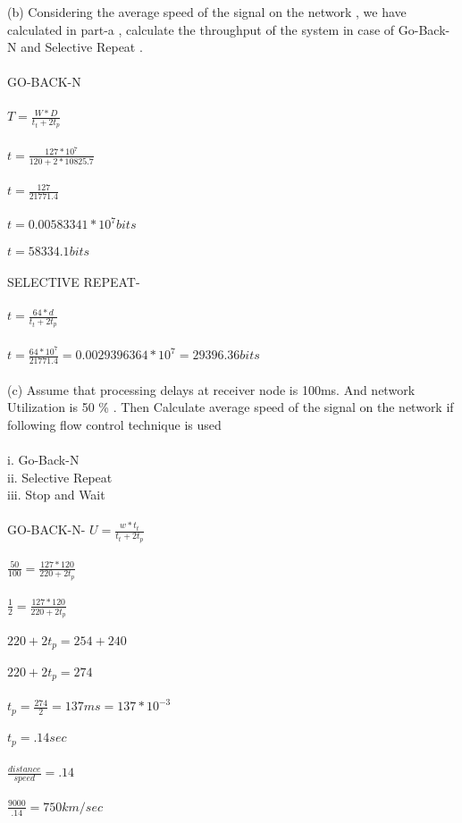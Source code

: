 \documentclass[a4paper,12pt]{article}
\begin{document}
(b) Considering the average speed of the signal on the network , we have calculated in
part-a , calculate the throughput of the system in case of Go-Back-N and Selective
Repeat .\\\\

GO-BACK-N\\\\
$T=\frac{W*D}{t_{t}+2t_{p}}$\\\\
$t=\frac{127*10^{7}}{120+2*10825.7}$\\\\
$t=\frac{127}{21771.4}$\\\\
$t=0.00583341*10^{7} bits$\\\\
$t=58334.1 bits$\\\\
SELECTIVE REPEAT-\\\\
$t=\frac{64*d}{t_{t}+2t_{p}}$\\\\
$t=\frac{64*10^{7}}{21771.4}=0.0029396364*10^{7}=29396.36 bits$\\\\

(c) Assume that processing delays at receiver node is 100ms. And network Utilization
is 50 \% . Then Calculate average speed of the signal on the network if following flow
control technique is used\\\\
i. Go-Back-N\\
ii. Selective Repeat\\
iii. Stop and Wait\\\\

GO-BACK-N-
$U=\frac{w*t_{t}}{t_{t}+2t_{p}}$\\\\
$\frac{50}{100}=\frac{127*120}{220+2t_{p}}$\\\\
$\frac{1}{2}=\frac{127*120}{220+2t_{p}}$\\\\
$220+2t_{p}=254+240$\\\\
$220+2t_{p}=274$\\\\
$t_{p}=\frac{274}{2}=137 ms =137*10^{-3}$\\\\
$t_{p}=.14 sec$\\\\
$\frac{distance}{speed}=.14$\\\\
$\frac{9000}{.14}=750 km/sec$\\\\
\end{document}
